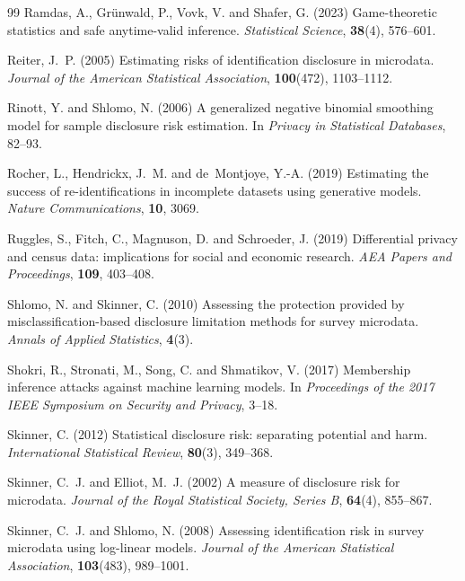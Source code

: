 \documentclass[11pt,a4paper]{article}
\theoremstyle{plain}
\theoremstyle{definition}
\begin{document}
\begin{thebibliography}{99}
Ramdas, A., Gr\"unwald, P., Vovk, V. and Shafer, G. (2023) Game-theoretic
statistics and safe anytime-valid inference. \emph{Statistical Science},
\textbf{38}(4), 576--601.

Reiter, J.~P. (2005) Estimating risks of identification disclosure in
microdata. \emph{Journal of the American Statistical Association},
\textbf{100}(472), 1103--1112.

Rinott, Y. and Shlomo, N. (2006) A generalized negative binomial smoothing
model for sample disclosure risk estimation. In \emph{Privacy in Statistical
Databases}, 82--93.

Rocher, L., Hendrickx, J.~M. and de~Montjoye, Y.-A. (2019) Estimating the
success of re-identifications in incomplete datasets using generative models.
\emph{Nature Communications}, \textbf{10}, 3069.

Ruggles, S., Fitch, C., Magnuson, D. and Schroeder, J. (2019) Differential
privacy and census data: implications for social and economic research.
\emph{AEA Papers and Proceedings}, \textbf{109}, 403--408.

Shlomo, N. and Skinner, C. (2010) Assessing the protection provided by
misclassification-based disclosure limitation methods for survey microdata.
\emph{Annals of Applied Statistics}, \textbf{4}(3).

Shokri, R., Stronati, M., Song, C. and Shmatikov, V. (2017) Membership inference
attacks against machine learning models. In \emph{Proceedings of the 2017 IEEE
Symposium on Security and Privacy}, 3--18.

Skinner, C. (2012) Statistical disclosure risk: separating potential and harm.
\emph{International Statistical Review}, \textbf{80}(3), 349--368.

Skinner, C.~J. and Elliot, M.~J. (2002) A measure of disclosure risk for
microdata. \emph{Journal of the Royal Statistical Society, Series B},
\textbf{64}(4), 855--867.

Skinner, C.~J. and Shlomo, N. (2008) Assessing identification risk in survey
microdata using log-linear models. \emph{Journal of the American Statistical
Association}, \textbf{103}(483), 989--1001.


\end{thebibliography}
\end{document}
